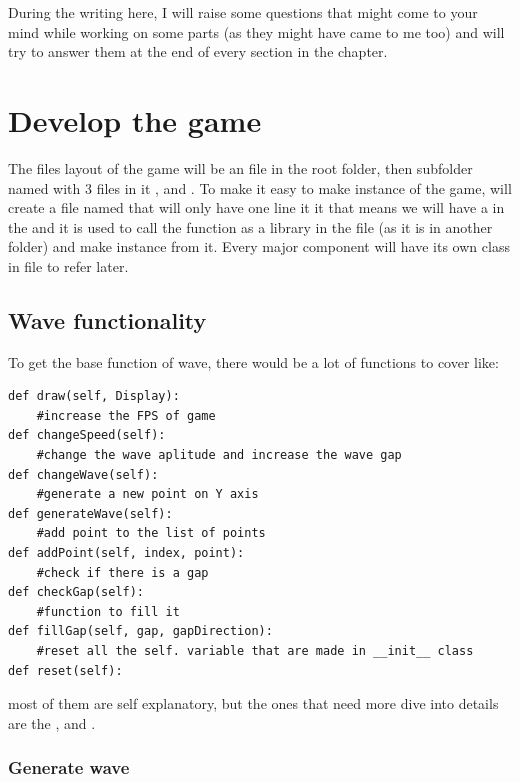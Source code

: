 During the writing here, I will raise some questions that might come to your mind while working on some parts (as they might have came to me too) and will try to answer them at the end of every section in the chapter.

\section{Develop the game}\label{develop-the-game}

The files layout of the game will be an  file in the root folder, then subfolder named  with 3 files in it ,  and . To make it easy to make instance of the game, will create a file named  that will only have one line it it  that means we will have a  in the  and it is used to call the  function as a library in the  file (as it is in another folder) and make instance from it. Every major component will have its own class in file to refer later. 

\subsection{Wave functionality}\label{wave-functionality}
To get the base function of wave, there would be a lot of functions to cover like:

\begin{verbatim}
def draw(self, Display):
	#increase the FPS of game
def changeSpeed(self):
	#change the wave aplitude and increase the wave gap
def changeWave(self):
	#generate a new point on Y axis
def generateWave(self):
	#add point to the list of points
def addPoint(self, index, point):
	#check if there is a gap 
def checkGap(self):
	#function to fill it
def fillGap(self, gap, gapDirection):
	#reset all the self. variable that are made in __init__ class 
def reset(self):
\end{verbatim}

most of them are self explanatory, but the ones that need more dive into details are the ,  and .

\subsubsection{Generate wave}


